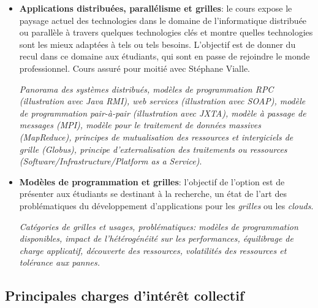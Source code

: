 \documentclass[11pt]{article}
\begin{document}
\begin{itemize}
\item \textbf{Applications distribuées, parallélisme et grilles}: le cours
expose le paysage actuel des technologies dans le domaine de l'informatique distribuée ou
parallèle à travers quelques technologies clés et montre quelles technologies sont les mieux adaptées 
à tels ou tels besoins.
L'objectif est de donner du recul dans ce domaine aux étudiants, qui sont en passe de rejoindre
le monde professionnel.
Cours assuré pour moitié avec Stéphane Vialle.

\textit{Panorama des systèmes distribués, modèles de programmation RPC (illustration avec Java RMI),
web services (illustration avec SOAP), modèle de programmation pair-à-pair (illustration avec JXTA),
modèle à passage de messages (MPI), modèle pour le traitement de données massives (MapReduce), principes 
de mutualisation des ressources et intergiciels de grille (Globus), principe d'externalisation 
des traitements ou ressources (Software/Infrastructure/Platform as a Service)}.\\
 

\item \textbf{Modèles de programmation et grilles}: l'objectif de l'option est de présenter aux étudiants
se destinant à la recherche, un état de l'art des problématiques du développement d'applications
pour les \emph{grilles} ou les \emph{clouds}.

\textit{Catégories de grilles et usages, problématiques: modèles de programmation
disponibles, impact de l'hétérogénéité sur les performances, équilibrage de charge
applicatif, découverte des ressources, volatilités des ressources et tolérance aux pannes.}
\end{itemize}


\subsection{Principales charges d'intérêt collectif}
\end{document}
